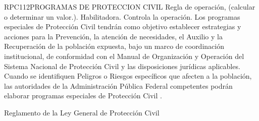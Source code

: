 \begin{BusinessRule}{RPC112}{PROGRAMAS DE PROTECCION CIVIL}{
		Regla de operación, (calcular o determinar un valor.).
	}{
		Habilitadora. 
	}{
		Controla la operación. %
	}
	\BRItem[Descripción:] Los programas especiales de Protección Civil tendrán como objetivo establecer estrategias y acciones para la Prevención, la atención de necesidades, el Auxilio y la Recuperación de la población expuesta, bajo un marco de coordinación institucional, de conformidad con el Manual de Organización y Operación del Sistema Nacional de Protección Civil y las disposiciones jurídicas aplicables.\\Cuando se identifiquen Peligros o Riesgos específicos que afecten a la población, las autoridades de la Administración Pública Federal competentes podrán elaborar programas especiales de Protección Civil .
	
	
	 Reglamento de la Ley General de Protección Civil
\end{BusinessRule}